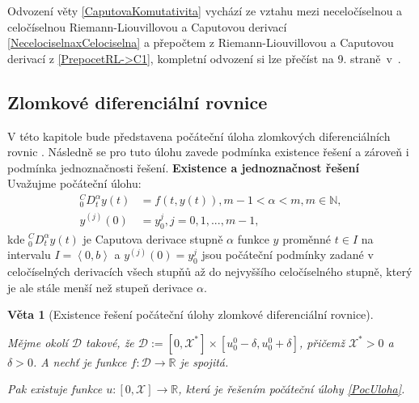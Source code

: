 \documentclass[a4paper,12pt,twoside]{article}
\newtheorem{veta}{Věta}[section]
\theoremstyle{definition}
\theoremstyle{remark}
\numberwithin{equation}{section}
\numberwithin{table}{section}
\numberwithin{figure}{section}
\newcommand{\R}{\mathbb{R}}
\newcommand{\N}{\mathbb{N}}
\begin{document}
Odvození věty \ref{CaputovaKomutativita} vychází ze vztahu mezi neceločíselnou a celočíselnou Riemann-Liouvillovou a Caputovou derivací \eqref{NecelociselnaxCelociselna} a přepočtem z Riemann-Liouvillovou a Caputovou derivací z \eqref{PrepocetRL->C1}, kompletní odvození si lze přečíst na 9. straně~v~\cite{Cangpin}.


\subsection{Zlomkové diferenciální rovnice}
V této kapitole bude představena počáteční úloha zlomkových diferenciálních rovnic \cite{Cangpin}. Následně se pro tuto úlohu zavede podmínka existence řešení a zároveň i podmínka jednoznačnosti řešení.
\textbf{Existence a jednoznačnost řešení} \\
Uvažujme počáteční úlohu:
\begin{equation} \label{PocUloha}
	\begin{aligned}
		^{C}_{0}D^{\alpha}_{t} y \left(t\right) &= f\left(t,y\left(t\right)\right), m-1 < \alpha < m, m \in \N, \\
		y^{\left(j\right)} \left(0\right) &= y_{0}^{j}, j=0,1,..., m-1,
	\end{aligned}	
\end{equation}
kde $^{C}_{0}D^{\alpha}_{t} y \left(t\right)$ je Caputova derivace stupně $\alpha$ funkce $y$ proměnné $t \in I$ na intervalu $I = \left\langle 0, b \right\rangle$ a $y^{\left(j\right)} \left(0\right) = y_{0}^{j}$ jsou počáteční podmínky zadané v celočíselných derivacích všech stupňů až do nejvyššího celočíselného stupně, který je ale stále menší než stupeň derivace $\alpha$.

\begin{veta}[Existence řešení počáteční úlohy zlomkové diferenciální rovnice]\label{ExistenceFDE}
	
	Mějme okolí $\mathcal{D}$ takové, že $\mathcal{D} := \left[0,\mathcal{X} ^{*}\right] \times \left[u_{0}^{0} - \delta , u_{0}^{0} + \delta \right] $, přičemž $\mathcal{X}^{*}>0$ a $ \delta  > 0$. A nechť je funkce $f: \mathcal{D} \to \R$ je spojitá.
	
	Pak existuje funkce $u:\left[0, \mathcal{X}\right] \to \R$, která je řešením počáteční úlohy \eqref{PocUloha}.
\end{veta} 
\end{document}
